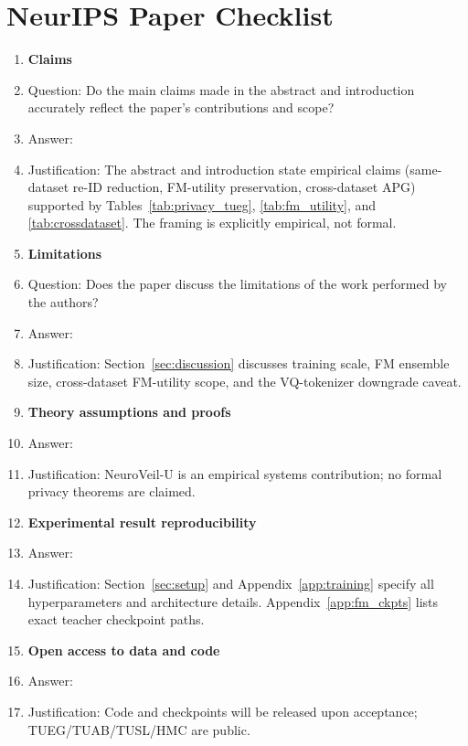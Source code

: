 \section*{NeurIPS Paper Checklist}

\begin{enumerate}

\item {\bf Claims}
    \item[] Question: Do the main claims made in the abstract and introduction accurately reflect the paper's contributions and scope?
    \item[] Answer: \answerYes{}
    \item[] Justification: The abstract and introduction state empirical claims (same-dataset re-ID reduction, FM-utility preservation, cross-dataset APG) supported by Tables~\ref{tab:privacy_tueg}, \ref{tab:fm_utility}, and \ref{tab:crossdataset}. The framing is explicitly empirical, not formal.

\item {\bf Limitations}
    \item[] Question: Does the paper discuss the limitations of the work performed by the authors?
    \item[] Answer: \answerYes{}
    \item[] Justification: Section~\ref{sec:discussion} discusses training scale, FM ensemble size, cross-dataset FM-utility scope, and the VQ-tokenizer downgrade caveat.

\item {\bf Theory assumptions and proofs}
    \item[] Answer: \answerNA{}
    \item[] Justification: NeuroVeil-U is an empirical systems contribution; no formal privacy theorems are claimed.

\item {\bf Experimental result reproducibility}
    \item[] Answer: \answerYes{}
    \item[] Justification: Section~\ref{sec:setup} and Appendix~\ref{app:training} specify all hyperparameters and architecture details. Appendix~\ref{app:fm_ckpts} lists exact teacher checkpoint paths.

\item {\bf Open access to data and code}
    \item[] Answer: \answerYes{}
    \item[] Justification: Code and checkpoints will be released upon acceptance; TUEG/TUAB/TUSL/HMC are public.


\end{enumerate}
